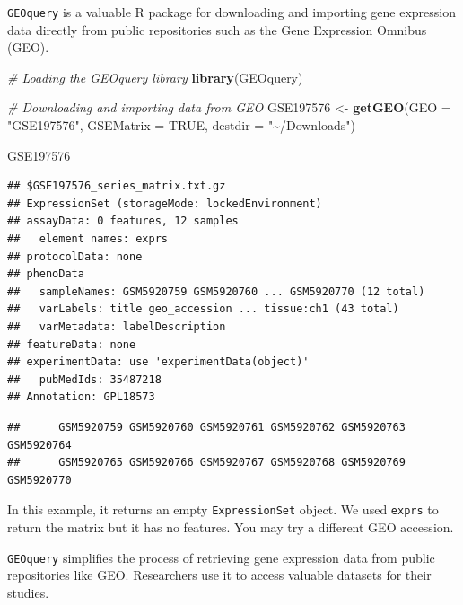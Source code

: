 \documentclass[
]{book}
\newenvironment{Shaded}{\begin{snugshade}}{\end{snugshade}}
\newcommand{\AttributeTok}[1]{\textcolor[rgb]{0.13,0.29,0.53}{#1}}
\newcommand{\CommentTok}[1]{\textcolor[rgb]{0.56,0.35,0.01}{\textit{#1}}}
\newcommand{\ConstantTok}[1]{\textcolor[rgb]{0.56,0.35,0.01}{#1}}
\newcommand{\FunctionTok}[1]{\textcolor[rgb]{0.13,0.29,0.53}{\textbf{#1}}}
\newcommand{\NormalTok}[1]{#1}
\newcommand{\OtherTok}[1]{\textcolor[rgb]{0.56,0.35,0.01}{#1}}
\newcommand{\SpecialCharTok}[1]{\textcolor[rgb]{0.81,0.36,0.00}{\textbf{#1}}}
\newcommand{\StringTok}[1]{\textcolor[rgb]{0.31,0.60,0.02}{#1}}
\begin{document}
\texttt{GEOquery} is a valuable R package for downloading and importing gene expression data directly from public repositories such as the Gene Expression Omnibus (GEO).

\begin{Shaded}
\begin{Highlighting}[]
\CommentTok{\# Loading the GEOquery library}
\FunctionTok{library}\NormalTok{(GEOquery)}

\CommentTok{\# Downloading and importing data from GEO}
\NormalTok{GSE197576 }\OtherTok{\textless{}{-}} \FunctionTok{getGEO}\NormalTok{(}\AttributeTok{GEO =} \StringTok{"GSE197576"}\NormalTok{, }\AttributeTok{GSEMatrix =} \ConstantTok{TRUE}\NormalTok{, }\AttributeTok{destdir =} \StringTok{"\textasciitilde{}/Downloads"}\NormalTok{)}

\NormalTok{GSE197576}
\end{Highlighting}
\end{Shaded}

\begin{verbatim}
## $GSE197576_series_matrix.txt.gz
## ExpressionSet (storageMode: lockedEnvironment)
## assayData: 0 features, 12 samples 
##   element names: exprs 
## protocolData: none
## phenoData
##   sampleNames: GSM5920759 GSM5920760 ... GSM5920770 (12 total)
##   varLabels: title geo_accession ... tissue:ch1 (43 total)
##   varMetadata: labelDescription
## featureData: none
## experimentData: use 'experimentData(object)'
##   pubMedIds: 35487218 
## Annotation: GPL18573
\end{verbatim}

\begin{Shaded}
\end{Shaded}

\begin{verbatim}
##      GSM5920759 GSM5920760 GSM5920761 GSM5920762 GSM5920763 GSM5920764
##      GSM5920765 GSM5920766 GSM5920767 GSM5920768 GSM5920769 GSM5920770
\end{verbatim}

In this example, it returns an empty \texttt{ExpressionSet} object. We used \texttt{exprs} to return
the matrix but it has no features. You may try a different GEO accession.

\texttt{GEOquery} simplifies the process of retrieving gene expression data from public repositories like GEO. Researchers use it to access valuable datasets for their studies.
\end{document}
